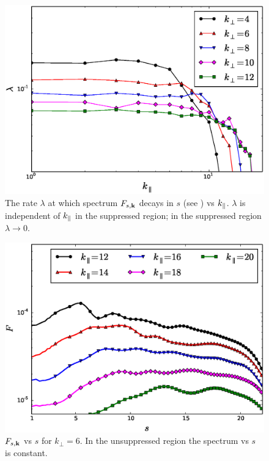     \begin{figure}
    \begin{center}
        \includegraphics[width=14.8cm]{figs/phmixnl/M900_lambda_vskz.eps}
        \caption{The rate $\lambda$ at which spectrum $F_{s,\mathbf{k}}$ decays in $s$ (see
        ) vs $k_\parallel$. $\lambda$ is independent of $k_\parallel$ in the
        suppressed region; in the suppressed region $\lambda \to 0$.}
        \label{phmixnl:fig:lambda:vskz}
    \end{center}
    \end{figure}
    \begin{figure}
    \begin{center}
        \includegraphics[width=14.8cm]{figs/phmixnl/M900_kp6_vss.eps}
        \caption{$F_{s,\mathbf{k}}$ vs $s$ for $k_\perp=6$. In the unsuppressed region the
        spectrum vs $s$ is constant.}
        \label{phmixnl:fig:m100f:kp6:vss}
    \end{center}
    \end{figure}
    
